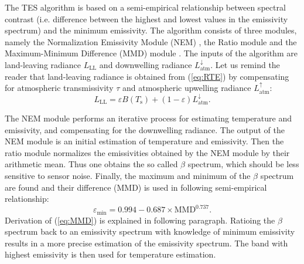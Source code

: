 The TES algorithm is based on a semi-empirical relationship between spectral contrast (i.e. difference between the highest and lowest values in the emissivity spectrum) and the minimum emissivity. The algorithm consists of three modules, namely the Normalization Emissivity Module (NEM) \cite{G86}, the Ratio module and the Maximum-Minimum Difference (MMD) module \cite{M94}. The inputs of the algorithm are land-leaving radiance $L_\mathrm{LL}$ and downwelling radiance $L^{\downarrow}_\mathrm{atm}$. Let us remind the reader that land-leaving radiance is obtained from (\ref{eq:RTE}) by compensating for atmospheric transmissivity $\tau$ and atmospheric upwelling radiance $L^{\uparrow}_\mathrm{atm}$:
\begin{equation}
\label{eq:landleavingRadiance}
L_\mathrm{LL} = \varepsilon B(T_\mathrm{s}) + (1 - \varepsilon) L^\downarrow_\mathrm{atm}.
\end{equation}

The NEM module performs an iterative process for estimating temperature and emissivity, and compensating for the downwelling radiance. The output of the NEM module is an initial estimation of temperature and emissivity. Then the ratio module normalizes the emissivities obtained by the NEM module by their arithmetic mean. Thus one obtains the so called $\beta$ spectrum, which should be less sensitive to sensor noise. Finally, the maximum and minimum of the $\beta$ spectrum are found and their difference (MMD) is used in following semi-empirical relationship:
\begin{equation} 
\label{eq:MMD}
\varepsilon_\mathrm{min} = 0.994 - 0.687 \times \mathrm{MMD}^{0.737}. 
\end{equation}
Derivation of (\ref{eq:MMD}) is explained in following paragraph. Ratioing the $\beta$ spectrum back to an emissivity spectrum with knowledge of minimum emissivity results in a more precise estimation of the emissivity spectrum. The band with highest emissivity is then used for temperature estimation.

